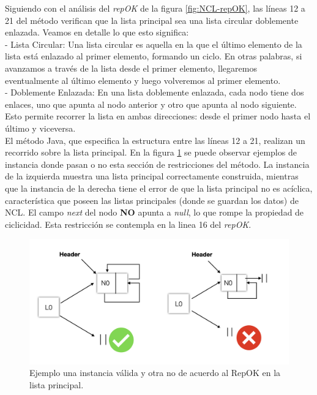 Siguiendo con el análisis del \emph{repOK} de la figura \ref{fig:NCL-repOK}, las líneas 12 a 21 del método verifican que la lista principal sea una lista circular doblemente enlazada. Veamos en detalle lo que esto significa:
\\
- Lista Circular: Una lista circular es aquella en la que el último elemento de la lista está enlazado al primer elemento, formando un ciclo. En otras palabras, si avanzamos a través de la lista desde el primer elemento, llegaremos eventualmente al último elemento y luego volveremos al primer elemento.
\\
- Doblemente Enlazada: En una lista doblemente enlazada, cada nodo tiene dos enlaces, uno que apunta al nodo anterior y otro que apunta al nodo siguiente. Esto permite recorrer la lista en ambas direcciones: desde el primer nodo hasta el último y viceversa.
\\
El método Java, que especifica la estructura entre las líneas 12 a 21, realizan un recorrido sobre la lista principal. 
En la figura \ref{fig:repok2} se puede observar ejemplos de instancia donde pasan o no esta sección de restricciones del método. La instancia de la izquierda muestra una lista principal correctamente construida, mientras que la instancia de la derecha tiene el error de  que la lista principal no es acíclica, característica que poseen las listas principales (donde se guardan los datos) de NCL. El campo \emph{next} del nodo \textbf{NO} apunta a \emph{null}, lo que rompe la propiedad de ciclicidad. Esta restricción se contempla en la linea 16 del \emph{repOK}.

\begin{figure}
  \centering
  \includegraphics[width=1.1\textwidth]{images/repok2.jpg}
  \caption{Ejemplo una instancia válida y otra no de acuerdo al RepOK en la lista principal.}
  \label{fig:repok2}
\end{figure}


